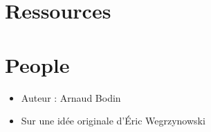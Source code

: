 \documentclass[class=report,crop=false, 12pt]{standalone}
\begin{document}
\section*{Ressources}

\section*{People}

\begin{itemize}
  \item Auteur : Arnaud Bodin
  \item Sur une idée originale d'Éric Wegrzynowski
\end{itemize}
\end{document}
